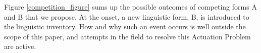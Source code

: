

Figure \ref{competition_figure} sums up the possible outcomes of competing forms A and B that we propose. 
At the onset, a new linguistic form, B, is introduced to the linguistic inventory.
How and why such an event occurs is well outside the scope of this paper, and attempts in the field to resolve this Actuation Problem are active.







%
%







 